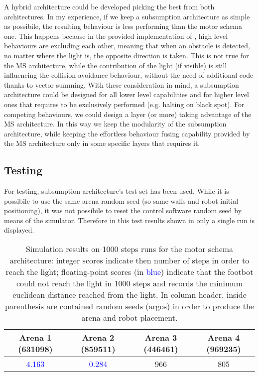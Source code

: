 A hybrid architecture could be developed picking the best from both
architectures. In my experience, if we keep a subsumption architecture as
simple as possibile, the resulting behaviour is less performing than the motor
schema one. This happens because in the provided implementation of
, high level behaviours are excluding each other, meaning
that when an obstacle is detected, no matter where the light is, the opposite
direction is taken. This is not true for the MS architecture, while the
contribution of the light (if visible) is still influencing the collision
avoidance behaviour, without the need of additional code thanks to vector
summing. With these consideration in mind, a subsumption architecture could be
designed for all lower level capabilities and for higher level ones that
requires to be exclusively performed (e.g. halting on black spot). For
competing behaviours, we could design a layer (or more) taking advantage of the
MS architecture.
In this way we keep the modularity of the subsumption architecture, while
keeping the effortless behaviour fusing capability provided by the MS
architecture only in some specific layers that requires it.

\subsection{Testing}
For testing,  subsumption architecture's test set has
been used. While it is possibile to use the same arena random seed (so same
walls and robot initial positioning), it was not possibile to reset the control
software random seed by means of the simulator. Therefore in this test results
shown in  only a single run is displayed.

\begin{table}[ht]
	\centering
	\begin{tabular}{cccc}
		\textbf{Arena 1} (631098) & \textbf{Arena 2} (859511) & \textbf{Arena 3} (446461) & \textbf{Arena 4} (969235) \\
		\hline
		\textcolor{blue}{4.163}   & \textcolor{blue}{0.284}   & 966                       & 805                       \\
	\end{tabular}
	\caption{Simulation results on 1000 steps runs for the motor schema
		architecture: integer scores indicate then number of steps in order to
		reach the light; floating-point scores (in \textcolor{blue}{blue})
		indicate that the footbot could not reach the light in 1000 steps and
		records the minimum euclidean distance reached from the light. In
		column header, inside parenthesis are contained random seeds (argos) in
		order to produce the arena and robot placement.}
	\label{tab:ms-results}
\end{table}

